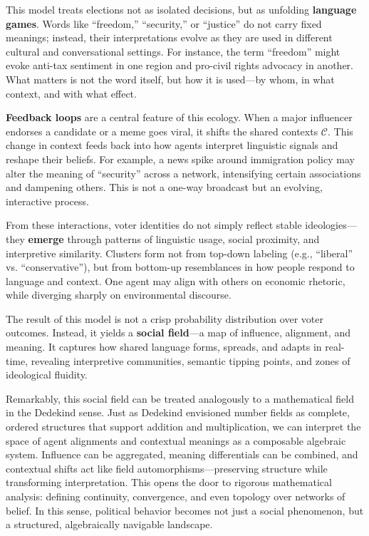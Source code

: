This model treats elections not as isolated decisions, but as unfolding \textbf{language games}. Words like “freedom,” “security,” or “justice” do not carry fixed meanings; instead, their interpretations evolve as they are used in different cultural and conversational settings. For instance, the term “freedom” might evoke anti-tax sentiment in one region and pro-civil rights advocacy in another. What matters is not the word itself, but how it is used—by whom, in what context, and with what effect.

\textbf{Feedback loops} are a central feature of this ecology. When a major influencer endorses a candidate or a meme goes viral, it shifts the shared contexts \( \mathcal{C} \). This change in context feeds back into how agents interpret linguistic signals and reshape their beliefs. For example, a news spike around immigration policy may alter the meaning of “security” across a network, intensifying certain associations and dampening others. This is not a one-way broadcast but an evolving, interactive process.

From these interactions, voter identities do not simply reflect stable ideologies—they \textbf{emerge} through patterns of linguistic usage, social proximity, and interpretive similarity. Clusters form not from top-down labeling (e.g., “liberal” vs. “conservative”), but from bottom-up resemblances in how people respond to language and context. One agent may align with others on economic rhetoric, while diverging sharply on environmental discourse.

The result of this model is not a crisp probability distribution over voter outcomes. Instead, it yields a \textbf{social field}—a map of influence, alignment, and meaning. It captures how shared language forms, spreads, and adapts in real-time, revealing interpretive communities, semantic tipping points, and zones of ideological fluidity. 

Remarkably, this social field can be treated analogously to a mathematical field in the Dedekind sense. Just as Dedekind envisioned number fields as complete, ordered structures that support addition and multiplication, we can interpret the space of agent alignments and contextual meanings as a composable algebraic system. Influence can be aggregated, meaning differentials can be combined, and contextual shifts act like field automorphisms—preserving structure while transforming interpretation. This opens the door to rigorous mathematical analysis: defining continuity, convergence, and even topology over networks of belief. In this sense, political behavior becomes not just a social phenomenon, but a structured, algebraically navigable landscape.

